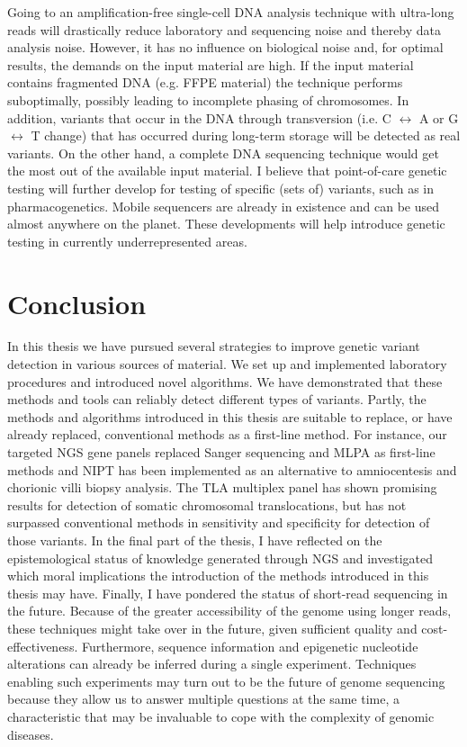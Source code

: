 Going to an amplification-free single-cell DNA analysis technique with ultra-long reads will drastically reduce laboratory and sequencing noise and thereby data analysis noise. 
However, it has no influence on biological noise and, for optimal results, the demands on the input material are high.
If the input material contains fragmented DNA (e.g. FFPE material) the technique performs suboptimally, possibly leading to incomplete phasing of chromosomes. 
In addition, variants that occur in the DNA through transversion (i.e. C $\leftrightarrow$ A or G $\leftrightarrow$ T change) that has occurred during long-term storage will be detected as real variants. On the other hand, a complete DNA sequencing technique would get the most out of the available input material.
I believe that point-of-care genetic testing will further develop for testing of specific (sets of) variants, such as in pharmacogenetics. 
Mobile sequencers are already in existence and can be used almost anywhere on the planet. 
These developments will help introduce genetic testing in currently underrepresented areas.

\section{Conclusion}
In this thesis we have pursued several strategies to improve genetic variant detection in various sources of material. 
We set up and implemented laboratory procedures and introduced novel algorithms. 
We have demonstrated that these methods and tools can reliably detect different types of variants. 
Partly, the methods and algorithms introduced in this thesis are suitable to replace, or have already replaced, conventional methods as a first-line method. 
For instance, our targeted NGS gene panels replaced Sanger sequencing and MLPA as first-line methods and NIPT has been implemented as an alternative to amniocentesis and chorionic villi biopsy analysis. 
The TLA multiplex panel has shown promising results for detection of somatic chromosomal translocations, but has not surpassed conventional methods in sensitivity and specificity for detection of those variants. 
In the final part of the thesis, I have reflected on the epistemological status of knowledge generated through NGS and investigated which moral implications the introduction of the methods introduced in this thesis may have. 
Finally, I have pondered the status of short-read sequencing in the future.
Because of the greater accessibility of the genome using longer reads, these techniques might take over in the future, given sufficient quality and cost-effectiveness. 
Furthermore, sequence information and epigenetic nucleotide alterations can already be inferred during a single experiment. 
Techniques enabling such experiments may turn out to be the future of genome sequencing because they allow us to answer multiple questions at the same time, a characteristic that may be invaluable to cope with the complexity of genomic diseases.